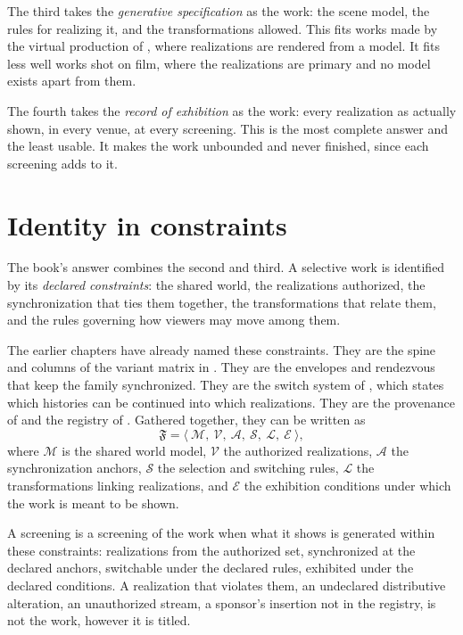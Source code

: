 The third takes the \emph{generative specification} as the work: the scene model, the rules for realizing it, and the transformations allowed. This fits works made by the virtual production of , where realizations are rendered from a model. It fits less well works shot on film, where the realizations are primary and no model exists apart from them.

The fourth takes the \emph{record of exhibition} as the work: every realization as actually shown, in every venue, at every screening. This is the most complete answer and the least usable. It makes the work unbounded and never finished, since each screening adds to it.

\section{Identity in constraints}

The book's answer combines the second and third. A selective work is identified by its \emph{declared constraints}: the shared world, the realizations authorized, the synchronization that ties them together, the transformations that relate them, and the rules governing how viewers may move among them.

The earlier chapters have already named these constraints. They are the spine and columns of the variant matrix in . They are the envelopes and rendezvous that keep the family synchronized. They are the switch system of , which states which histories can be continued into which realizations. They are the provenance of  and the registry of . Gathered together, they can be written as
\begin{equation}
\mathfrak F=\big\langle\ \mathcal M,\ \mathcal V,\ \mathcal A,\ \mathcal S,\ \mathcal L,\ \mathcal E\ \big\rangle,
\end{equation}
where $\mathcal M$ is the shared world model, $\mathcal V$ the authorized realizations, $\mathcal A$ the synchronization anchors, $\mathcal S$ the selection and switching rules, $\mathcal L$ the transformations linking realizations, and $\mathcal E$ the exhibition conditions under which the work is meant to be shown.

A screening is a screening of the work when what it shows is generated within these constraints: realizations from the authorized set, synchronized at the declared anchors, switchable under the declared rules, exhibited under the declared conditions. A realization that violates them, an undeclared distributive alteration, an unauthorized stream, a sponsor's insertion not in the registry, is not the work, however it is titled.

